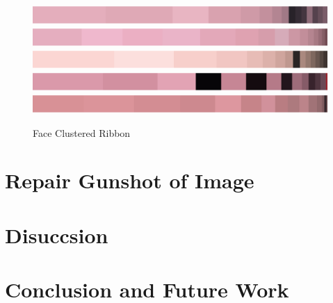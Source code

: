 \documentclass{article}
\begin{document}
\begin{figure}[htbp]
    \centering
        {\includegraphics[width=\textwidth]{main_files/figure-latex/15_4_orange_marilyn_face_color_ribbon.pdf}}
        {\includegraphics[width=\textwidth]{main_files/figure-latex/18_4_red_marilyn_face_color_ribbon.pdf}}
        {\includegraphics[width=\textwidth]{main_files/figure-latex/21_4_turq_marilyn_face_color_ribbon.pdf}}
        {\includegraphics[width=\textwidth]{main_files/figure-latex/24_4_blue_marilyn_face_color_ribbon.pdf}}
        {\includegraphics[width=\textwidth]{main_files/figure-latex/27_4_eggblue_marilyn_face_color_ribbon.pdf}}
    \caption{Face Clustered Ribbon}
\end{figure}

\hypertarget{repair-gunshot-of-image}{%
\section{Repair Gunshot of Image}\label{repair-gunshot-of-image}}

\hypertarget{disuccsion}{%
\section{Disuccsion}\label{disuccsion}}

\hypertarget{conclusion-and-future-work}{%
\section*{Conclusion and Future Work}\label{conclusion-and-future-work}}
\end{document}
